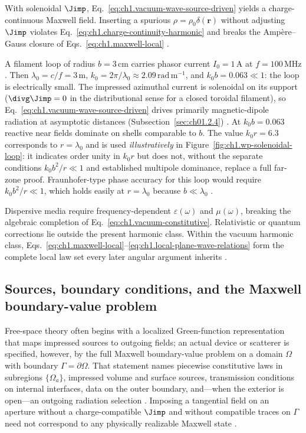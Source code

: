 With solenoidal \(\Jimp\), Eq.~\eqref{eq:ch1.vacuum-wave-source-driven} yields a charge-continuous Maxwell field. Inserting a spurious \(\rho=\rho_0\delta(\mathbf{r})\) without adjusting \(\Jimp\) violates Eq.~\eqref{eq:ch1.charge-continuity-harmonic} and breaks the Amp\`ere--Gauss closure of Eqs.~\eqref{eq:ch1.maxwell-local} \cite{maxwell1873,stratton1941}.

\begin{example}
\label{ex:ch1.filament-loop}
A filament loop of radius \(b=3\,\mathrm{cm}\) carries phasor current \(I_0=1\,\mathrm{A}\) at \(f=100\,\mathrm{MHz}\). Then \(\lambda_0=c/f=3\,\mathrm{m}\), \(k_0=2\pi/\lambda_0\approx2.09\,\mathrm{rad\,m^{-1}}\), and \(k_0 b=0.063\ll1\): the loop is electrically small. The impressed azimuthal current is solenoidal on its support (\(\divg\Jimp=0\) in the distributional sense for a closed toroidal filament), so Eq.~\eqref{eq:ch1.vacuum-wave-source-driven} drives primarily magnetic-dipole radiation at asymptotic distances (Subsection~\ref{sec:ch01.2.4}) \cite{stratton1941,harrington2001}. At \(k_0 b=0.063\) reactive near fields dominate on shells comparable to \(b\). The value \(k_0 r=6.3\) corresponds to \(r=\lambda_0\) and is used \emph{illustratively} in Figure~\ref{fig:ch1.wp-solenoidal-loop}: it indicates order unity in \(k_0 r\) but does not, without the separate conditions \(k_0 b^2/r\ll1\) and established multipole dominance, replace a full far-zone proof. Fraunhofer-type phase accuracy for this loop would require \(k_0 b^2/r\ll1\), which holds easily at \(r=\lambda_0\) because \(b\ll\lambda_0\) \cite{stratton1941,jackson1999}.
\end{example}

Dispersive media require
frequency-dependent \(\varepsilon(\omega)\) and \(\mu(\omega)\), breaking the
algebraic completion of Eq.~\eqref{eq:ch1.vacuum-constitutive}. Relativistic or
quantum corrections lie outside the present harmonic class. Within the vacuum harmonic class,
Eqs.~\eqref{eq:ch1.maxwell-local}--\eqref{eq:ch1.local-plane-wave-relations}
form the complete local law set every later angular argument inherits
\cite{maxwell1873}.

\subsection{Sources, boundary conditions, and the Maxwell boundary-value problem}
\label{sec:ch01.1.2}

Free-space theory often begins with a localized Green-function representation that maps impressed sources to outgoing fields; an actual device or scatterer is specified, however, by the full Maxwell boundary-value problem on a domain $\Omega$ with boundary $\Gamma=\partial\Omega$. That statement names piecewise constitutive laws in subregions $\{\Omega_a\}$, impressed volume and surface sources, transmission conditions on internal interfaces, data on the outer boundary, and---when the exterior is open---an outgoing radiation selection \cite{stratton1941,maxwell1873}. Imposing a tangential field on an aperture without a charge-compatible $\Jimp$ and without compatible traces on $\Gamma$ need not correspond to any physically realizable Maxwell state \cite{harrington2001,chu1948}.

